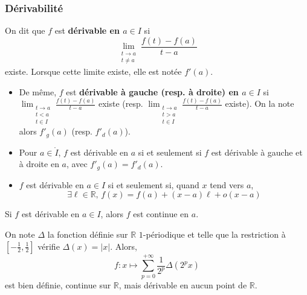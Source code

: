   \subsubsection{Dérivabilité}


  \begin{definition}
    On dit que $f$ est \textbf{dérivable en $a \in I$} si
    \[ \lim_{\substack{t \rightarrow a \\ t \neq a}} \frac{f(t) - f(a)}{t-a} \]
    existe. Lorsque cette limite existe, elle est notée $f'(a)$.
  \end{definition}

  \begin{remark}
    \begin{itemize}
      \item De même, $f$ est \textbf{dérivable à gauche (resp. à droite) en $a \in I$} si $\lim_{\substack{t \rightarrow a \\ t < a \\ t \in I}} \frac{f(t) - f(a)}{t-a}$ existe (resp. $\lim_{\substack{t \rightarrow a \\ t > a \\ t \in I}} \frac{f(t) - f(a)}{t-a}$ existe). On la note alors $f'_g(a)$ (resp. $f'_d(a)$).
      \item Pour $a \in \mathring I$, $f$ est dérivable en $a$ si et seulement si $f$ est dérivable à gauche et à droite en $a$, avec $f'_g(a) = f'_d(a)$.
      \item $f$ est dérivable en $a \in I$ si et seulement si, quand $x$ tend vers $a$,
      \[ \exists \ell \in \mathbb{R}, \, f(x) = f(a) + (x-a)\ell + o(x-a) \]
    \end{itemize}
  \end{remark}

  \begin{proposition}
    Si $f$ est dérivable en $a \in I$, alors $f$ est continue en $a$.
  \end{proposition}


  \begin{cexample}
    On note $\Delta$ la fonction définie sur $\mathbb{R}$ $1$-périodique et telle que la restriction à $\left[ -\frac{1}{2}, \frac{1}{2} \right]$ vérifie $\Delta(x) = \vert x \vert$. Alors,
    \[ f : x \mapsto \sum_{p=0}^{+\infty} \frac{1}{2^p} \Delta (2^p x) \]
    est bien définie, continue sur $\mathbb{R}$, mais dérivable en aucun point de $\mathbb{R}$.
  \end{cexample}

